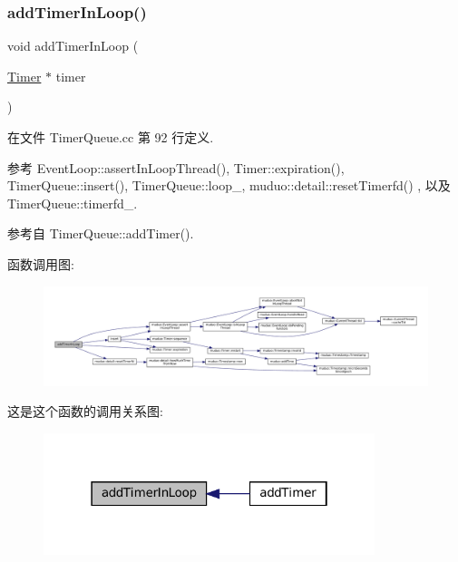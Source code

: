 \subsubsection{\texorpdfstring{add\+Timer\+In\+Loop()}{addTimerInLoop()}}
{\footnotesize\ttfamily void add\+Timer\+In\+Loop (\begin{DoxyParamCaption}\item[{\hyperlink{classmuduo_1_1Timer}{Timer} $\ast$}]{timer }\end{DoxyParamCaption})\hspace{0.3cm}{\ttfamily [private]}}



在文件 Timer\+Queue.\+cc 第 92 行定义.



参考 Event\+Loop\+::assert\+In\+Loop\+Thread(), Timer\+::expiration(), Timer\+Queue\+::insert(), Timer\+Queue\+::loop\+\_\+, muduo\+::detail\+::reset\+Timerfd() , 以及 Timer\+Queue\+::timerfd\+\_\+.



参考自 Timer\+Queue\+::add\+Timer().

函数调用图\+:
\nopagebreak
\begin{figure}[H]
\begin{center}
\leavevmode
\includegraphics[width=350pt]{classmuduo_1_1TimerQueue_adff791c94ab893d2adae1eafe03713ad_cgraph}
\end{center}
\end{figure}
这是这个函数的调用关系图\+:
\nopagebreak
\begin{figure}[H]
\begin{center}
\leavevmode
\includegraphics[width=274pt]{classmuduo_1_1TimerQueue_adff791c94ab893d2adae1eafe03713ad_icgraph}
\end{center}
\end{figure}
\mbox{\label{classmuduo_1_1TimerQueue_af8b24b02bbff6a657fa5b0190bef9b9b}} 
